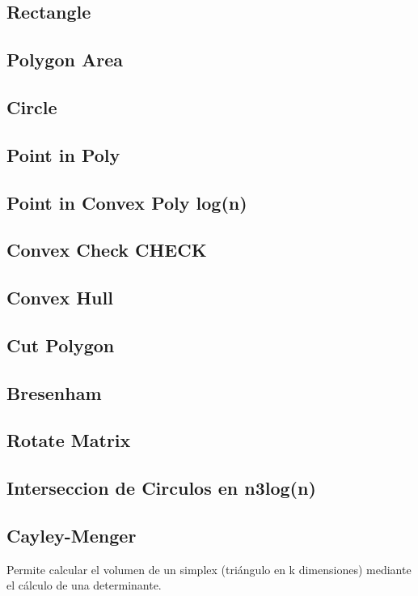 \subsection{Rectangle}
\subsection{Polygon Area}
\subsection{Circle}
\subsection{Point in Poly}
\subsection{Point in Convex Poly log(n)}
\subsection{Convex Check CHECK}
\subsection{Convex Hull}
\subsection{Cut Polygon}
\subsection{Bresenham}
\subsection{Rotate Matrix}
\subsection{Interseccion de Circulos en n3log(n)}

\subsection{Cayley-Menger}
{
Permite calcular el volumen de un simplex (triángulo en k dimensiones) mediante el cálculo de una determinante.
}

